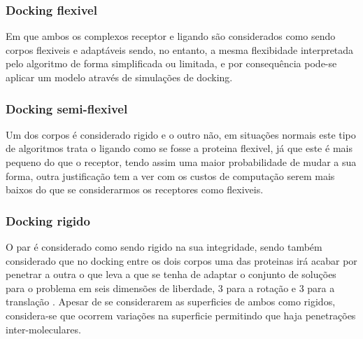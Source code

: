 	\subsubsection{Docking flexivel} Em que ambos os complexos receptor e ligando são considerados como sendo corpos flexiveis e adaptáveis sendo, no entanto, a mesma flexibidade interpretada pelo algoritmo de forma simplificada ou limitada, e por consequência pode-se aplicar um modelo através de simulações de docking.

	\subsubsection{Docking semi-flexivel} Um dos corpos é considerado rigido e o outro não, em situações normais este tipo de algoritmos trata o ligando como se fosse a proteina flexivel, já que este é mais pequeno do que o receptor, tendo assim uma maior probabilidade de mudar a sua forma, outra justificação tem a ver com os custos de computação serem mais baixos do que se considerarmos os receptores como flexiveis.

	\subsubsection{Docking rigido} 
	O par é considerado como sendo rigido na sua integridade, sendo também considerado que no docking entre os dois corpos uma das proteinas irá acabar por penetrar a outra o que leva a que se tenha de adaptar o conjunto de soluções para o problema em seis 		dimensões de liberdade, 3 para a rotação e 3 para a translação \cite{vakser2014protein}. Apesar de se considerarem as superficies de ambos como rigidos, considera-se que ocorrem variações na superficie permitindo que haja penetrações inter-moleculares.
